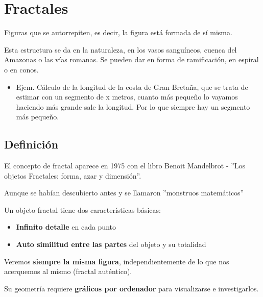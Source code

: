 \chapter{Fractales}
Figuras que se autorrepiten, es decir, la figura está formada de sí misma.

Esta estructura se da en la naturaleza, en los vasos sanguíneos, cuenca del Amazonas o las vías romanas. Se pueden dar en forma de ramificación, en espiral o en conos.
\begin{itemize}
    \item Ejem. Cálculo de la longitud de la costa de Gran Bretaña, que se trata de estimar con un segmento de x metros, cuanto más pequeño lo vayamos haciendo más grande sale la longitud. Por lo que siempre hay un segmento más pequeño. 

\end{itemize}

\section{Definición}
El concepto de fractal aparece en 1975 con el libro Benoit Mandelbrot - ''Los objetos Fractales: forma, azar y dimensión''.

Aunque se habían descubierto antes y se llamaron ''monstruos matemáticos''

Un objeto fractal tiene dos características básicas:
\begin{itemize}
    \item \textbf{Infinito detalle} en cada punto 
    \item \textbf{Auto similitud entre las partes} del objeto y su totalidad
\end{itemize}
Veremos \textbf{siempre la misma figura}, independientemente de lo que nos acerquemos al mismo (fractal auténtico).

Su geometría requiere \textbf{gráficos por ordenador} para visualizarse e investigarlos.

